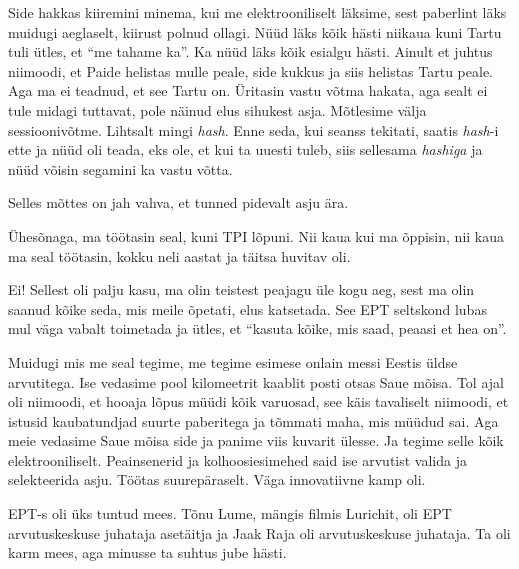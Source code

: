 Side hakkas kiiremini minema, kui me elektrooniliselt läksime, sest paberlint läks muidugi aeglaselt, kiirust polnud ollagi.  Nüüd läks kõik hästi niikaua kuni Tartu tuli ütles, et \enquote{me tahame ka}. Ka nüüd läks kõik esialgu hästi. Ainult et juhtus niimoodi, et Paide helistas mulle peale, side kukkus ja siis helistas Tartu peale. Aga ma ei teadnud, et see Tartu on. Üritasin vastu võtma hakata, aga sealt ei tule midagi tuttavat, pole näinud elus sihukest asja. Mõtlesime välja sessioonivõtme. Lihtsalt mingi \emph{hash}. Enne seda, kui seanss tekitati, saatis \emph{hash}-i ette ja nüüd oli teada, eks ole, et kui ta uuesti tuleb, siis sellesama \emph{hashiga} ja nüüd võisin segamini ka vastu võtta. 


Selles mõttes on jah vahva, et tunned pidevalt asju ära. 

Ühesõnaga, ma töötasin seal, kuni TPI lõpuni. Nii kaua kui ma õppisin, nii kaua ma seal töötasin, kokku neli aastat ja täitsa huvitav oli.


Ei! Sellest oli palju kasu, ma olin teistest peajagu üle kogu aeg, sest ma olin saanud kõike seda, mis meile õpetati, elus katsetada. See EPT seltskond lubas mul väga vabalt toimetada ja ütles, et \enquote{kasuta kõike, mis saad, peaasi et hea on}. 

Muidugi mis me seal tegime, me tegime esimese onlain messi Eestis üldse arvutitega. Ise vedasime pool kilomeetrit kaablit posti otsas Saue mõisa. Tol ajal oli niimoodi, et hooaja lõpus müüdi kõik varuosad, see käis tavaliselt niimoodi, et  istusid kaubatundjad suurte paberitega ja tõmmati maha, mis müüdud sai. Aga meie vedasime Saue mõisa side ja panime viis kuvarit ülesse. Ja tegime selle kõik elektrooniliselt. Peainsenerid ja kolhoosiesimehed said ise arvutist valida ja selekteerida asju. Töötas suurepäraselt. Väga innovatiivne kamp oli.


EPT-s oli üks tuntud mees. Tõnu Lume, mängis filmis Lurichit, oli EPT arvutuskeskuse juhataja asetäitja ja Jaak Raja oli arvutuskeskuse juhataja. Ta oli karm mees, aga minusse ta suhtus jube hästi. 

